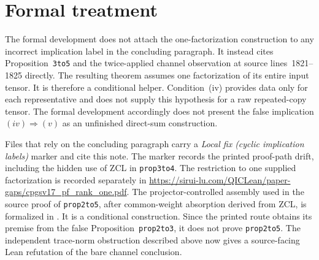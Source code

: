 \documentclass{article}
\begin{document}
\section{Formal treatment}

The formal development does not attach the one-factorization construction to
any incorrect implication label in the concluding paragraph. It instead cites
Proposition~\texttt{3to5} and the twice-applied channel observation at source
lines~1821--1825 directly. The resulting theorem assumes one factorization of
its entire input tensor. It is therefore a conditional helper. Condition~(iv)
provides data only for each representative and does not supply this hypothesis
for a raw repeated-copy tensor. The formal development accordingly does not
present the false implication $(iv)\Rightarrow(v)$ as an unfinished
direct-sum construction.

Files that rely on the concluding paragraph carry a \emph{Local fix (cyclic
implication labels)} marker and cite this note. The marker records the printed
proof-path drift, including the hidden use of ZCL in \texttt{prop3to4}. The
restriction to one supplied factorization is recorded separately in
\url{https://sirui-lu.com/QICLean/paper-gaps/cpgsv17_pf_rank_one.pdf}. The projector-controlled
assembly used in the source proof of \texttt{prop2to5}, after common-weight
absorption derived from ZCL, is formalized in . It is a
conditional construction. Since the printed route obtains its premise from the
false Proposition~\texttt{prop2to3}, it does not prove \texttt{prop2to5}. The
independent trace-norm obstruction described above now gives a source-facing
Lean refutation of the bare channel conclusion.



\end{document}
